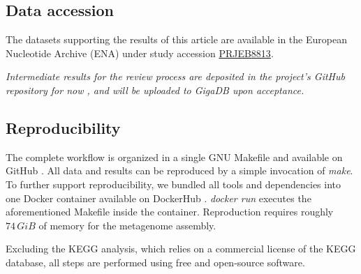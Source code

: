 \documentclass{bmcart}
\begin{document}
\subsection*{Data accession}
The datasets supporting the results of this article are available in the European Nucleotide Archive (ENA) under study accession \href{http://www.ebi.ac.uk/ena/data/view/PRJEB8813}{PRJEB8813}.

\emph{Intermediate results for the review process are deposited in the project's GitHub repository for now \cite{GitHub}, and will be uploaded to GigaDB \cite{GigaDB} upon acceptance.}

\subsection*{Reproducibility}
The complete workflow is organized in a single GNU Makefile and available on GitHub \cite{GitHub}.
All data and results can be reproduced by a simple invocation of \emph{make}.
To further support reproducibility, we bundled all tools and dependencies into one Docker container available on DockerHub \cite{DockerHub}. \emph{docker run} executes the aforementioned Makefile inside the container. Reproduction requires roughly $74\,GiB$ of memory for the metagenome assembly.

Excluding the KEGG analysis, which relies on a commercial license of the KEGG database, all steps are performed using free and open-source software.

\end{document}

